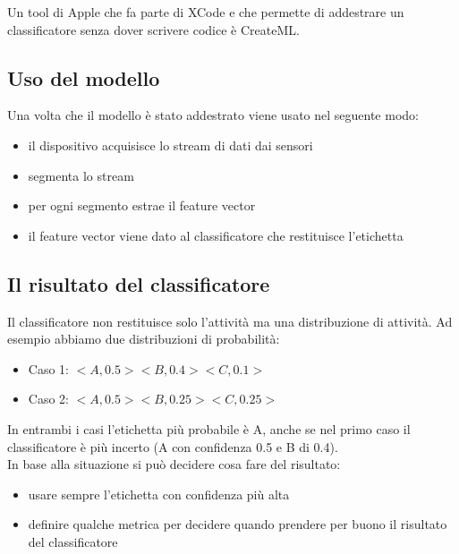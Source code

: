 Un tool di Apple che fa parte di XCode e che permette di addestrare un classificatore senza dover scrivere codice è CreateML.

\subsection{Uso del modello}
Una volta che il modello è stato addestrato viene usato nel seguente modo:
\begin{itemize}
    \item il dispositivo acquisisce lo stream di dati dai sensori
    \item segmenta lo stream
    \item per ogni segmento estrae il feature vector
    \item il feature vector viene dato al classificatore che restituisce l'etichetta
\end{itemize}

\subsection{Il risultato del classificatore}
Il classificatore non restituisce solo l'attività ma una distribuzione di attività. 
Ad esempio abbiamo due distribuzioni di probabilità:
\begin{itemize}
    \item Caso 1: $<A, 0.5> <B, 0.4> <C, 0.1>$ 
    \item Caso 2: $<A, 0.5> <B, 0.25> <C, 0.25>$
\end{itemize}
In entrambi i casi l'etichetta più probabile è A, anche se nel primo caso il classificatore è più incerto (A con confidenza 0.5 e B di 0.4). \\
In base alla situazione si può decidere cosa fare del risultato: 
\begin{itemize}
    \item usare sempre l'etichetta con confidenza più alta
    \item definire qualche metrica per decidere quando prendere per buono il risultato del classificatore
\end{itemize}